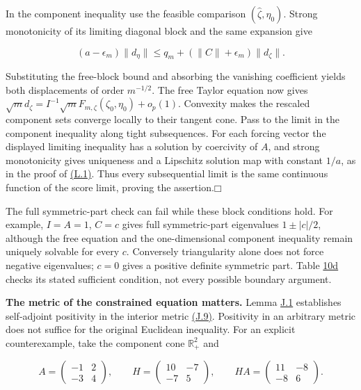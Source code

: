 \documentclass[11pt]{article}
\providecommand{\square}{\mdlgwhtsquare}
\begin{document}
In the component inequality use the feasible comparison \((\widehat\zeta,\eta_0)\). Strong monotonicity of its limiting diagonal block and the same expansion give

\begin{equation*}
(a-\epsilon_m)\|d_\eta\|
 \leq q_m+(\|C\|+\epsilon_m)\|d_\zeta\|.
\end{equation*}

Substituting the free-block bound and absorbing the vanishing coefficient yields both displacements of order \(m^{-1/2}\). The free Taylor equation now gives \(\sqrt m d_\zeta=I^{-1}\sqrt m F_{m,\zeta}(\zeta_0,\eta_0)+o_p(1)\). Convexity makes the rescaled component sets converge locally to their tangent cone. Pass to the limit in the component inequality along tight subsequences. For each forcing vector the displayed limiting inequality has a solution by coercivity of \(A\), and strong monotonicity gives uniqueness and a Lipschitz solution map with constant \(1/a\), as in the proof of \hyperref[eq:L.1]{(L.1)}. Thus every subsequential limit is the same continuous function of the score limit, proving the assertion.\hfill$\square$

The full symmetric-part check can fail while these block conditions hold. For example, \(I=A=1\), \(C=c\) gives full symmetric-part eigenvalues \(1\pm |c|/2\), although the free equation and the one-dimensional component inequality remain uniquely solvable for every \(c\). Conversely triangularity alone does not force negative eigenvalues; \(c=0\) gives a positive definite symmetric part. Table \hyperref[tab:10d]{10d} checks its stated sufficient condition, not every possible boundary argument.

\textbf{The metric of the constrained equation matters.} Lemma \hyperref[res:Lemma-J.1]{J.1} establishes self-adjoint positivity in the interior metric \hyperref[eq:J.9]{(J.9)}. Positivity in an arbitrary metric does not suffice for the original Euclidean inequality. For an explicit counterexample, take the component cone \(\mathbb R_+^2\) and

\begin{equation*}
A=\begin{pmatrix}-1&2\\-3&4\end{pmatrix},\qquad
H=\begin{pmatrix}10&-7\\-7&5\end{pmatrix},\qquad
HA=\begin{pmatrix}11&-8\\-8&6\end{pmatrix}.
\end{equation*}
\end{document}
